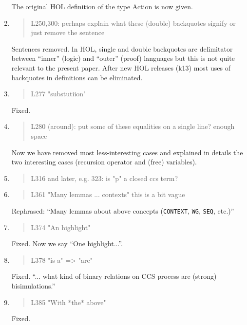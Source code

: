\begin{enumerate}
  The original HOL definition of the type Action is now given.
  
\item \begin{quote}
    L250,300: perhaps explain what these (double) backquotes signify or just remove the sentence
  \end{quote}
  Sentences removed. In HOL, single and double backquotes are
  delimitator between ``inner'' (logic) and ``outer'' (proof)
  languages but this is not quite relevant to the present paper.
  After new HOL releases (k13) most uses of backquotes in  definitions can be eliminated.
  
\item \begin{quote}
    L277 "substutiion"
  \end{quote}
  Fixed.
  
\item \begin{quote}
    L280 (around): put some of these equalities on a single line? enough space
  \end{quote}
  Now we have removed most less-interesting cases and explained in
  details the two interesting cases (recursion operator and (free) variables).
  
\item \begin{quote}
    L316 and later, e.g. 323: is "p" a closed ccs term?
  \end{quote}

\item \begin{quote}
    L361 "Many lemmas ... contexts" this is a bit vague
  \end{quote}

  Rephrased: ``Many lemmas about above concepts (\texttt{CONTEXT}, \texttt{WG},
  \texttt{SEQ}, etc.)''
  
\item \begin{quote}
    L374 "An highlight"
  \end{quote}
  Fixed. Now we say ``One highlight...''.
  
\item \begin{quote}
    L378 "is a" => "are"
  \end{quote}
  Fixed. ``... what kind of binary relations on CCS process are (strong) bisimulations.''
  
\item \begin{quote}
    L385 "With *the* above"
  \end{quote}
  Fixed.
  

\end{enumerate}
